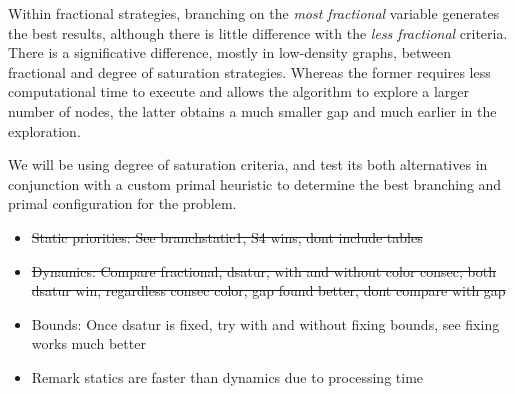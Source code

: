 Within fractional strategies, branching on the \textit{most fractional} variable generates the best results, although there is little difference with the \textit{less fractional} criteria. There is a significative difference, mostly in low-density graphs, between fractional and degree of saturation strategies. Whereas the former requires less computational time to execute and allows the algorithm to explore a larger number of nodes, the latter obtains a much smaller gap and much earlier in the exploration.

We will be using degree of saturation criteria, and test its both alternatives in conjunction with a custom primal heuristic to determine the best branching and primal configuration for the problem.

\begin{itemize}
\item \sout{Static priorities: See branchstatic1, S4 wins, dont include tables}
\item \sout{Dynamics: Compare fractional, dsatur, with and without color consec; both dsatur win, regardless consec color, gap found better, dont compare with gap}
\item Bounds: Once dsatur is fixed, try with and without fixing bounds, see fixing works much better
\item Remark statics are faster than dynamics due to processing time
\end{itemize}